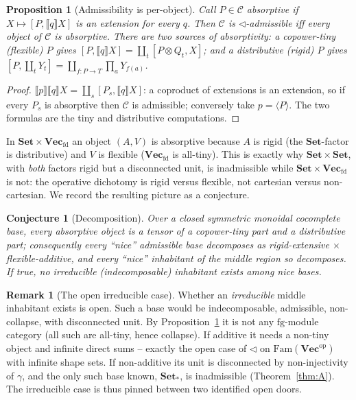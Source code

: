 \documentclass[11pt]{amsart}
\theoremstyle{plain}
\newtheorem{proposition}[theorem]{Proposition}
\newtheorem{conjecture}[theorem]{Conjecture}
\theoremstyle{definition}
\newtheorem{remark}[theorem]{Remark}
\newcommand{\C}{\mathcal{C}}
\newcommand{\Fam}{\mathrm{Fam}}
\newcommand{\ext}[1]{\llbracket #1 \rrbracket}
\newcommand{\Setb}{\mathbf{Set}}
\newcommand{\Vecb}{\mathbf{Vec}}
\newcommand{\Vecfd}{\mathbf{Vec}_{\mathrm{fd}}}
\newcommand{\op}{\mathrm{op}}
\newcommand{\comp}{\mathbin{\triangleleft}}
\newcommand{\gena}[1]{\langle #1 \rangle}
\begin{document}
\begin{proposition}[Admissibility is per-object]\label{prop:absorptive}
Call $P\in\C$ \emph{absorptive} if $X\mapsto[P,\ext q X]$ is an extension for every $q$. Then $\C$ is
$\comp$-admissible iff every object of $\C$ is absorptive. There are two sources of absorptivity: a
copower-tiny (\emph{flexible}) $P$ gives $[P,\ext q X]=\coprod_t[P\otimes Q_t,X]$; and a
distributive (\emph{rigid}) $P$ gives $[P,\coprod_t Y_t]=\coprod_{f:P\to T}\prod_a Y_{f(a)}$.
\end{proposition}
\begin{proof}
$\ext p\ext q X=\coprod_s[P_s,\ext q X]$: a coproduct of extensions is an extension, so if every $P_s$
is absorptive then $\C$ is admissible; conversely take $p=\gena{P}$. The two formulas are the tiny and
distributive computations.
\end{proof}

In $\Setb\times\Vecfd$ an object $(A,V)$ is absorptive because $A$ is rigid (the $\Setb$-factor is
distributive) and $V$ is flexible ($\Vecfd$ is all-tiny). This is exactly why $\Setb\times\Setb$, with
\emph{both} factors rigid but a disconnected unit, is inadmissible while $\Setb\times\Vecfd$ is not:
the operative dichotomy is rigid versus flexible, not cartesian versus non-cartesian. We record the
resulting picture as a conjecture.

\begin{conjecture}[Decomposition]\label{conj:decomp}
Over a closed symmetric monoidal cocomplete base, every absorptive object is a tensor of a
copower-tiny part and a distributive part; consequently every ``nice'' admissible base decomposes as
\emph{rigid-extensive $\times$ flexible-additive}, and every ``nice'' inhabitant of the middle region
so decomposes. If true, no \emph{irreducible} (indecomposable) inhabitant exists among nice bases.
\end{conjecture}

\begin{remark}[The open irreducible case]\label{rem:gap1}
Whether an \emph{irreducible} middle inhabitant exists is open. Such a base would be indecomposable,
admissible, non-collapse, with disconnected unit. By Proposition~\ref{prop:absorptive} it is not any
$\mathrm{fg}$-module category (all such are all-tiny, hence collapse). If additive it needs a non-tiny
object and infinite direct sums -- exactly the open case of $\comp$ on $\Fam(\Vecb^{\op})$ with
infinite shape sets. If non-additive its unit is disconnected by non-injectivity of $\gamma$, and the
only such base known, $\Setb_*$, is inadmissible (Theorem~\ref{thm:A}). The irreducible case is thus
pinned between two identified open doors.
\end{remark}
\end{document}
